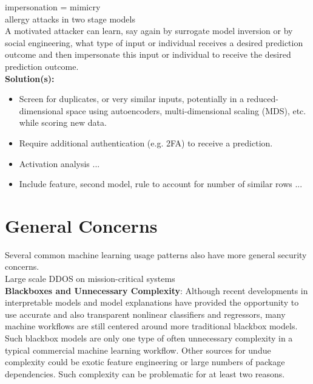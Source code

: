 \documentclass[fleqn]{article}
\begin{document}
impersonation = mimicry \\
allergy attacks in two stage models\\

A motivated attacker can learn, say again by surrogate model inversion or by social engineering, what type of input or individual receives a desired prediction outcome and then impersonate this input or individual to receive the desired prediction outcome. \\

\noindent\textbf{Solution(s):} 
\begin{itemize}
\item Screen for duplicates, or very similar inputs, potentially in a reduced-dimensional space using autoencoders, multi-dimensional scaling (MDS), etc. while scoring new data.
\item Require additional authentication (e.g. 2FA) to receive a prediction.
\item Activation analysis ...
\item Include feature, second model, rule to account for number of similar rows ... 
\end{itemize}

\section{General Concerns}

Several common machine learning usage patterns also have more general security concerns.\\

Large scale DDOS on mission-critical systems\\

\noindent\textbf{Blackboxes and Unnecessary Complexity}: Although recent developments in interpretable models and model explanations have provided the opportunity to use accurate and also transparent nonlinear classifiers and regressors, many machine workflows are still centered around more traditional blackbox models. Such blackbox models are only one type of often unnecessary complexity in a typical commercial machine learning workflow. Other sources for undue complexity could be exotic feature engineering or large numbers of package dependencies. Such complexity can be problematic for at least two reasons. 
\end{document}
